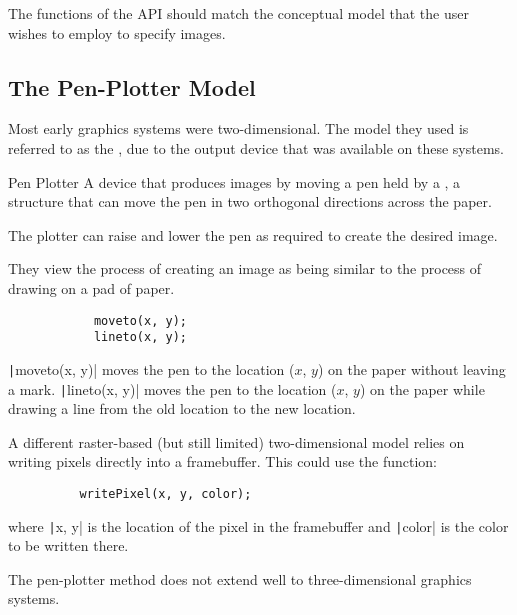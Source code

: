 \documentclass[../COS3712_Notes.tex]{subfiles}
\begin{document}
      The functions of the API should match the conceptual model
      that the user wishes to employ to specify images.

      \subsection{The Pen-Plotter Model}
        Most early graphics systems were two-dimensional.
        The model they used is referred to as the \mbox{},
        due to the output device that was available on these systems.

        \begin{definition}{Pen Plotter}
          A device that produces images by moving a pen held by a ,
          a structure that can move the pen in two orthogonal directions across the paper.

          The plotter can raise and lower the pen as required to create the desired image.

          They view the process of creating an image as being similar to the process of
          drawing on a pad of paper.
        \end{definition}

        \begin{example}
          \begin{verbatim}
            moveto(x, y);
            lineto(x, y);
          \end{verbatim}
          \texttt|moveto(x, y)| moves the pen to the location ($x$, $y$)
          on the paper without leaving a mark.
          \texttt|lineto(x, y)| moves the pen to the location ($x$, $y$)
          on the paper while drawing a line from the old location to the new location.
        \end{example}

        A different raster-based (but still limited) two-dimensional model
        relies on writing pixels directly into a framebuffer.
        This could use the function:
        \begin{verbatim}
          writePixel(x, y, color);
        \end{verbatim}
        where \texttt|x, y| is the location of the pixel in the framebuffer
        and \texttt|color| is the color to be written there.

        The pen-plotter method does not extend well to three-dimensional graphics systems.
\end{document}
